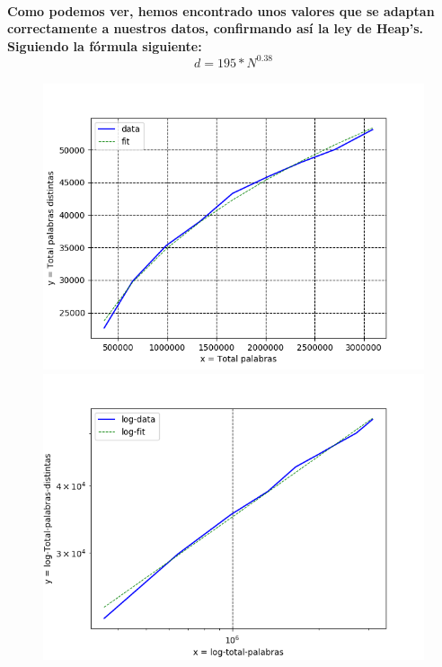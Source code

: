 \documentclass{article}
\begin{document}
  \paragraph{
  Como podemos ver, hemos encontrado unos valores que se adaptan correctamente a nuestros datos, confirmando as\'i la ley de Heap's.
  Siguiendo la f\'ormula siguiente:
  \[d = 195*N^{0.38}\]
  }
  \begin{figure}
     \begin{minipage}[b]{0.4\textwidth}
       \includegraphics[width=\textwidth]{Heaps}
     \end{minipage}
     \hfill
     \begin{minipage}[b]{0.4\textwidth}
       \includegraphics[width=\textwidth]{Heaps-log}
     \end{minipage}
  \end{figure}
\end{document}
